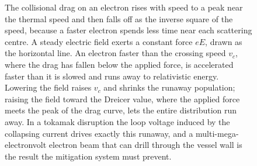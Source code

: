 \begin{figure}[htbp]
\centering
{}
\caption[Runaway electrons and the critical field]{The collisional drag on an
electron rises with speed to a peak near the thermal speed and then falls off
as the inverse square of the speed, because a faster electron spends less time
near each scattering centre. A steady electric field exerts a constant force
$eE$, drawn as the horizontal line. An electron faster than the crossing speed
$v_c$, where the drag has fallen below the applied force, is accelerated
faster than it is slowed and runs away to relativistic energy. Lowering the
field raises $v_c$ and shrinks the runaway population; raising the field toward
the Dreicer value, where the applied force meets the peak of the drag curve,
lets the entire distribution run away. In a tokamak disruption the loop
voltage induced by the collapsing current drives exactly this runaway, and a
multi-mega-electronvolt electron beam that can drill through the vessel wall is
the result the mitigation system must prevent.}
\label{fig:vol04ch13:runaway}
\end{figure}
